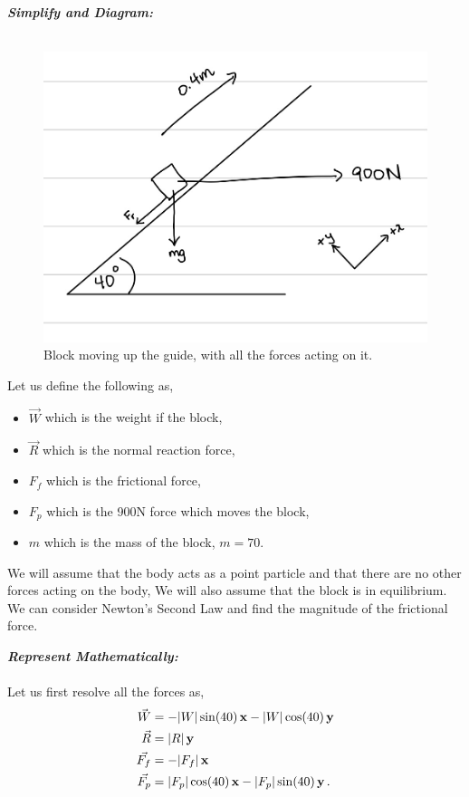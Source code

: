 \begin{subquestions}
\begin{subsubquestions}

\subsubquestion

\textbf{\textit{Simplify and Diagram:}} \\ \\
\begin{figure}[H]
	\begin{center}
		\includegraphics[scale=0.25]{../2011/figures/2011q6-1}
		\caption{\label{2011:q6:Diagram3} Block moving up the guide, with all the forces acting on it.}
	\end{center}
\end{figure}

Let us define the following as,
\begin{itemize}
	\item $\vec{W}$ which is the weight if the block,
	\item $\vec{R}$ which is the normal reaction force,
	\item $F_f$ which is the frictional force,
	\item $F_{p}$ which is the 900N force which moves the block,
	\item $m$ which is the mass of the block, $m=70$.
\end{itemize}
We will assume that the body acts as a point particle and that there are no other forces acting on the body, We will also assume that the block is in equilibrium. We can consider Newton's Second Law and find the magnitude of the frictional force.




\textbf{\textit{Represent Mathematically:}} \\ \\
Let us first resolve all the forces as,
\begin{align}
	\vec{W} & = -|W|\sin(40)\,\mathbf{x} - |W|\cos(40)\,\mathbf{y}  \\ 
	\vec{R} & = |R|\,\mathbf{y}  \\ 
	\vec{F_f} & = -|F_f|\,\mathbf{x}  \\
	\vec{F_p} & = |F_p|\cos(40) \,\mathbf{x} -|F_p|\sin(40) \,\mathbf{y} \,.
\end{align}


\end{subsubquestions}
\end{subquestions}
